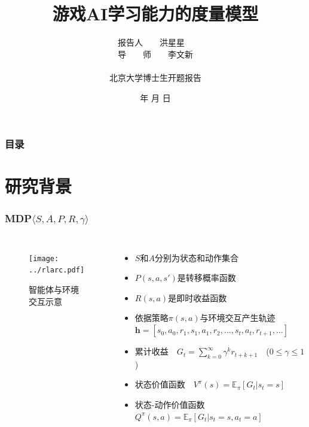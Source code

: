 \documentclass{beamer}
\renewcommand{\today}{\number\year 年 \number\month 月 \number\day 日}
\begin{document}
\begin{CJK*}{GBK}{hei}
\title{游戏AI学习能力的度量模型}
\author{报告人~~~~洪星星~~\\ 导~~~~师~~~~李文新\\ ~~~~~~~~~~~~~~~~~~~~~~~\\ 北京大学博士生开题报告}
\date{\today}
\frame{\titlepage}

\begin{frame}
\frametitle{目录}
\tableofcontents
\end{frame}

\section{研究背景}
\begin{frame}\frametitle{MDP$\langle S, A, P, R, \gamma\rangle$}
\begin{columns}
    \begin{figure}[htbp]
        \centering\texttt{[image: ../rlarc.pdf]}
	    \caption{智能体与环境交互示意}
    \end{figure}
    {\small{
    \begin{itemize}
        \item $S$和$A$分别为状态和动作集合
        \item $P(s, a, s')$是转移概率函数
        \item $R(s, a)$是即时收益函数
        \item 依据策略$\pi(s, a)$与环境交互产生轨迹~~$\boldsymbol{h}=[s_0,a_0,r_1,s_1,a_1,r_2,\dots,s_t,a_t,r_{t+1},\dots]$
        \item 累计收益~~$ G_{t} =\sum_{k=0}^{\infty}\gamma^{k}r_{t+k+1}$~~($0\leq \gamma\leq 1$)
        \item 状态价值函数~~$V^{\pi}(s)=\mathbb{E}_{\pi}\left[G_{t} | s_{t}=s\right]$
        \item 状态-动作价值函数~~$Q^{\pi}(s, a)=\mathbb{E}_{\pi}\left[G_{t} | s_{t}=s, a_{t}=a\right]$
    \end{itemize}
    }}
\end{columns}
\end{frame}


\end{CJK*}
\end{document}
